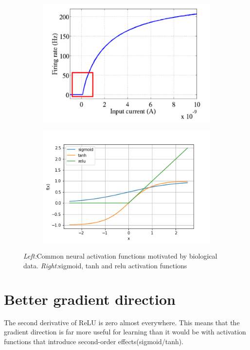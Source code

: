 \documentclass{article}
\begin{document}
\begin{figure}[H]
  \begin{subfigure}[b]{0.4\textwidth}
    \includegraphics[width=\textwidth]{biological_neuron.png}
    \label{fig:1}
  \end{subfigure}
  \begin{subfigure}[b]{0.45\textwidth}
    \includegraphics[width=\textwidth]{activations.png}
    \label{fig:2}
  \end{subfigure}
  \caption{\textit{Left:}Common neural activation functions motivated by biological data. \textit{Right:}sigmoid, tanh and relu activation functions}
\end{figure}

\section*{Better gradient direction} The second derivative of ReLU is zero almost everywhere. This means that the gradient direction is far more useful for learning than it would be with activation functions that introduce second-order effects(sigmoid/tanh).
\end{document}
